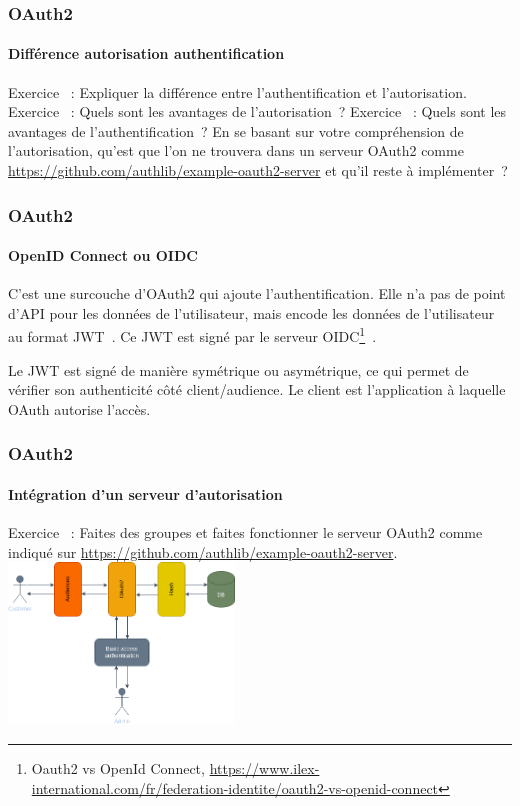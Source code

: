 \documentclass{beamer}
\begin{document}
    \begin{frame}
        \frametitle{OAuth2}
        \framesubtitle{Différence autorisation authentification}
        \transdissolve
        Exercice \execcounterdispinc{}~:
        Expliquer la différence entre l'authentification et l'autorisation.
        \bigbreak
        Exercice \execcounterdispinc{}~:
        Quels sont les avantages de l'autorisation~?
        \bigbreak
        Exercice \execcounterdispinc{}~:
        Quels sont les avantages de l'authentification~?
        En se basant sur votre compréhension de l'autorisation, qu'est que l'on ne trouvera dans un serveur OAuth2 comme \url{https://github.com/authlib/example-oauth2-server} et qu'il reste à implémenter~?
    \end{frame}

    \begin{frame}
        \frametitle{OAuth2}
        \framesubtitle{OpenID Connect ou OIDC}
        \transdissolve
        C'est une surcouche d'OAuth2 qui ajoute l'authentification.
        Elle n'a pas de point d'API pour les données de l'utilisateur, mais encode les données de l'utilisateur au format JWT~.
        Ce JWT est signé par le serveur OIDC\footnote{Oauth2 vs OpenId Connect, \url{https://www.ilex-international.com/fr/federation-identite/oauth2-vs-openid-connect}}~.

        Le JWT est signé de manière symétrique ou asymétrique, ce qui permet de vérifier son authenticité côté client/audience.
        \bigbreak
        Le client est l'application à laquelle OAuth autorise l'accès.
    \end{frame}

    \begin{frame}
        \frametitle{OAuth2}
        \framesubtitle{Intégration d'un serveur d'autorisation}
        \transdissolve
        Exercice \execcounterdispinc{}~:
        Faites des groupes et faites fonctionner le serveur OAuth2 comme indiqué sur \url{https://github.com/authlib/example-oauth2-server}.
        \bigbreak
        \centering
        \includegraphics[width=6cm]{image/OAuth2-integration.drawio}
    \end{frame}
\end{document}

